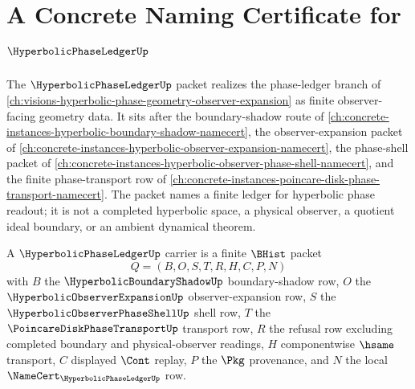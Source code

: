 \chapter{A Concrete Naming Certificate for $\HyperbolicPhaseLedgerUp$}
\label{ch:concrete-instances-hyperbolic-phase-ledger-namecert}

The $\HyperbolicPhaseLedgerUp$ packet realizes the phase-ledger branch of \autoref{ch:visions-hyperbolic-phase-geometry-observer-expansion} as finite observer-facing geometry data. It sits after the boundary-shadow route of \autoref{ch:concrete-instances-hyperbolic-boundary-shadow-namecert}, the observer-expansion packet of \autoref{ch:concrete-instances-hyperbolic-observer-expansion-namecert}, the phase-shell packet of \autoref{ch:concrete-instances-hyperbolic-observer-phase-shell-namecert}, and the finite phase-transport row of \autoref{ch:concrete-instances-poincare-disk-phase-transport-namecert}. The packet names a finite ledger for hyperbolic phase readout; it is not a completed hyperbolic space, a physical observer, a quotient ideal boundary, or an ambient dynamical theorem.

\begin{definition}
\label{def:hyperbolic-phase-ledger-carrier}
A $\HyperbolicPhaseLedgerUp$ carrier is a finite $\BHist$ packet
$$
Q=(B,O,S,T,R,H,C,P,N)
$$
with $B$ the $\HyperbolicBoundaryShadowUp$ boundary-shadow row, $O$ the $\HyperbolicObserverExpansionUp$ observer-expansion row, $S$ the $\HyperbolicObserverPhaseShellUp$ shell row, $T$ the $\PoincareDiskPhaseTransportUp$ transport row, $R$ the refusal row excluding completed boundary and physical-observer readings, $H$ componentwise $\hsame$ transport, $C$ displayed $\Cont$ replay, $P$ the $\Pkg$ provenance, and $N$ the local $\NameCert_{\HyperbolicPhaseLedgerUp}$ row.
\end{definition}

